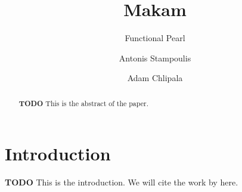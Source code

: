 \documentclass[format=acmlarge,review,anonymous]{acmart}\settopmatter{printfolios=true}
\begin{document}
\title{Makam}
\subtitle{Functional Pearl}

\author{Antonis Stampoulis}

\author{Adam Chlipala}

\newcommand\TODO[0]{\textbf{TODO}}
\newcommand\lamprolog[0]{$\lambda$Prolog\xspace}
\newcommand\fomega[0]{F$\omega$\xspace}
\newenvironment{codequote}{\begin{quote}\begin{alltt}}{\end{alltt}\end{quote}}

\begin{abstract}
\TODO{} This is the abstract of the paper.
\end{abstract}



\maketitle



\section{Introduction}

\TODO{} This is the introduction. We will cite the work by \citet{miller1988overview} here.
\end{document}
